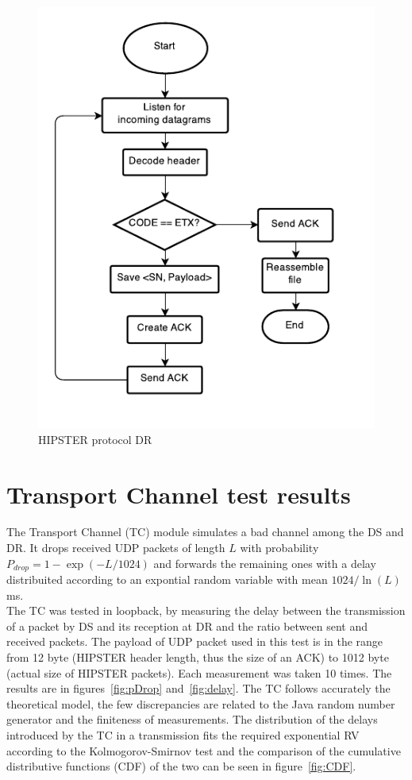 \documentclass[10pt,twocolumn]{article}
\begin{document}
\begin{figure}[h]
  \centering
  \includegraphics[width=0.75\columnwidth, keepaspectratio]{Documentation/Receiver.pdf}
  \caption{HIPSTER protocol DR}
  \label{fig:receiverFlowchart}
\end{figure}

\section{Transport Channel test results}
The Transport Channel (TC) module simulates a bad channel among the DS and DR. It drops received UDP packets of length $L$ with probability $P_{drop} = 1 - \exp(-L/1024)$ and forwards the remaining ones with a delay distribuited according to an expontial random variable with mean $1024/\ln(L)$ ms. \\
The TC was tested in loopback, by measuring the delay between the transmission of a packet by DS and its reception at DR and the ratio between sent and received packets. The payload of UDP packet used in this test is in the range from 12 byte (HIPSTER header length, thus the size of an ACK) to 1012 byte (actual size of HIPSTER packets). Each measurement was taken 10 times. The results are in figures~\ref{fig:pDrop} and~\ref{fig:delay}. The TC follows accurately the theoretical model, the few discrepancies are related to the Java random number generator and the finiteness of measurements. The distribution of the delays introduced by the TC in a transmission fits the required exponential RV according to the Kolmogorov-Smirnov test and the comparison of the cumulative distributive functions (CDF) of the two can be seen in figure~\ref{fig:CDF}.
\end{document}
